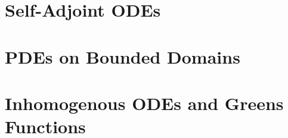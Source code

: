 
\def\npart {IB}
\def\nterm {Michaelmas}
\def\nyear {2022}
\def\nlecturer {Dr E P Shellard}
\def\ncourse {Methods}


\newcommand{\inv}{^{-1}}

\author{Based on lectures by \nlecturer \ and notes by thirdsgames.co.uk}


% 


    \maketitle
    \tableofcontents

    \part{Self-Adjoint ODEs}
    
    
    \part{PDEs on Bounded Domains}
    
    \part{Inhomogenous ODEs and Greens Functions}
